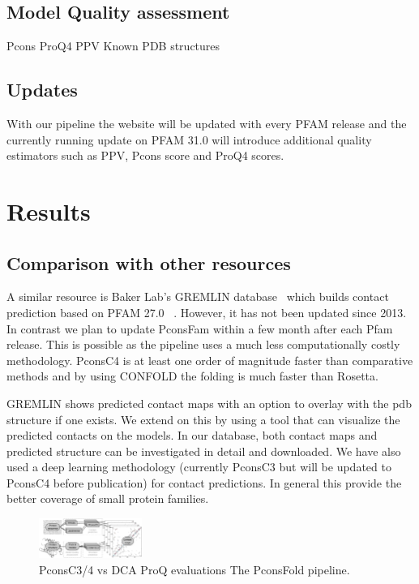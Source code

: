 \documentclass[a4,center,fleqn]{NAR}
\begin{document}
\subsection{Model Quality assessment}
Pcons
ProQ4
PPV
Known PDB structures

\subsection{Updates}

With our pipeline the website will be updated with every PFAM release
and the currently running update on PFAM 31.0 will introduce
additional quality estimators such as PPV, Pcons score and ProQ4
scores. 

\section{Results}

\subsection{Comparison with other resources}

A similar resource is Baker Lab’s GREMLIN database~\cite{Kamisetty2013} which builds contact prediction based on
PFAM 27.0~\cite{Sonnhammer:1997} . However, it has not been updated since
2013. In contrast we plan to update PconsFam within a few month after
each Pfam release. This is possible as the pipeline uses a much less
computationally costly methodology. PconsC4 is at least one order of
magnitude faster than comparative methods and by using CONFOLD the
folding is much faster than Rosetta.


GREMLIN shows predicted contact maps with an option to overlay with
the pdb structure if one exists. We extend on this by using a tool
that can visualize the predicted contacts on the models. In our
database, both contact maps and predicted structure can be
investigated in detail and downloaded.  We have also used a deep
learning methodology (currently PconsC3 but will be updated to PconsC4
before publication) for contact predictions. In general this provide
the better coverage of small protein families.




\begin{figure}[t]
\begin{center}
\end{center}
\caption{PconsC3/4 vs DCA
ProQ evaluations 
The PconsFold pipeline.}
\label{fig:Pipeline}
    \includegraphics[width=0.3\textwidth]{figures/flowchart.eps}
\end{figure}
\end{document}
